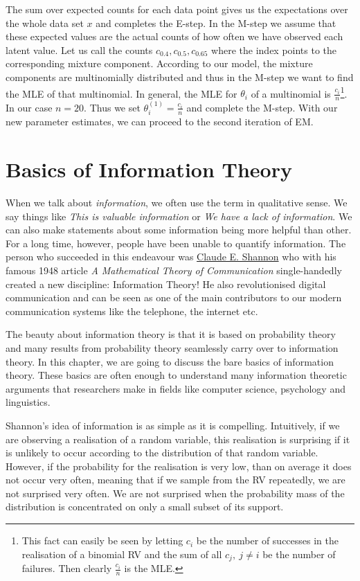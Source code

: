 The sum over expected counts for each data point gives us the expectations over the whole data set $ x $ and completes the E-step.
In the M-step we assume that these expected values are the actual counts of how often we have observed each latent value. Let us call the counts 
$ c_{0.4}, c_{0.5}, c_{0.65} $ where the index points to the corresponding mixture component. According to our model, the mixture components are multinomially
distributed and thus in the M-step we want to find the MLE of that multinomial. In general, the MLE for $ \theta_{i} $ of a multinomial is
$ \frac{c_{i}}{n} $\footnote{This fact can easily be seen by letting $ c_{i} $ be the number of successes in the realisation of a binomial RV and the sum of all
$ c_{j},~j \not = i $ be the number of failures. Then clearly $ \frac{c_{i}}{n} $ is the MLE.}. In our case $ n=20 $. Thus we set 
$ \theta_{i}^{(1)} = \frac{c_{i}}{n} $ and complete the M-step. With our new parameter estimates, we can proceed to the second iteration of EM.

\section{Basics of Information Theory}

When we talk about \textit{information}, we often use the term in qualitative sense. We say things like 
\textit{This is valuable information} or 
\textit{We have a lack of information}. We can also make statements about some information being more helpful than other. For a long time, however,
people have been unable to quantify information. The person who succeeded in this endeavour was \href{https://en.wikipedia.org/wiki/Claude_Shannon}{Claude E. Shannon}
who with his famous 1948 article \textit{A Mathematical Theory of Communication} single-handedly created a new discipline: Information Theory! He also revolutionised
digital communication and can be seen as one of the main contributors to our modern communication systems like the telephone, the internet etc. 

The beauty about information theory is that it is based on probability theory and many results from probability theory seamlessly carry over to information theory.
In this chapter, we are going to discuss the bare basics of information theory. These basics are often enough to understand many information theoretic arguments
that researchers make in fields like computer science, psychology and linguistics.

Shannon's idea of information is as simple as it is compelling. Intuitively, if we are observing a realisation of a random variable, this realisation is surprising
if it is unlikely to occur according to the distribution of that random variable. However, if the probability for the realisation is very low, than on average it
does not occur very often, meaning that if we sample from the RV repeatedly, we are not surprised very often. We are not surprised when the probability
mass of the distribution is concentrated on only a small subset of its support. 

